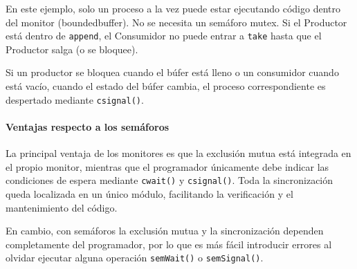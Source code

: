En este ejemplo, solo un proceso a la vez puede estar ejecutando código dentro del monitor (boundedbuffer). No se necesita un semáforo mutex. Si el Productor está dentro de \texttt{append}, el Consumidor no puede entrar a \texttt{take} hasta que el Productor salga (o se bloquee).

Si un productor se bloquea cuando el búfer está lleno o un consumidor cuando está vacío, cuando el estado del búfer cambia, el proceso correspondiente es despertado mediante \texttt{csignal()}.

\paragraph{Ventajas respecto a los semáforos}

La principal ventaja de los monitores es que la exclusión mutua está integrada en el propio monitor, mientras que el programador únicamente debe indicar las condiciones de espera mediante \texttt{cwait()} y \texttt{csignal()}. Toda la sincronización queda localizada en un único módulo, facilitando la verificación y el mantenimiento del código.

En cambio, con semáforos la exclusión mutua y la sincronización dependen completamente del programador, por lo que es más fácil introducir errores al olvidar ejecutar alguna operación \texttt{semWait()} o \texttt{semSignal()}.

